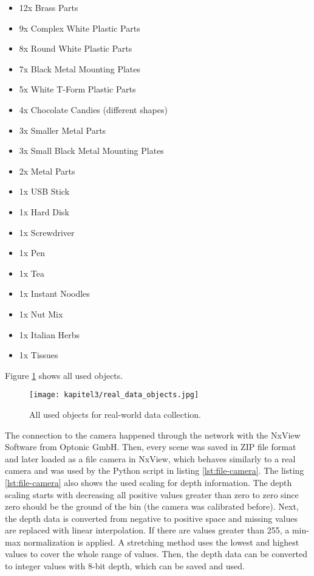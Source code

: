 		\begin{itemize}
			\item 12x Brass Parts
			\item 9x Complex White Plastic Parts
			\item 8x Round White Plastic Parts
			\item 7x Black Metal Mounting Plates
			\item 5x White T-Form Plastic Parts
			\item 4x Chocolate Candies (different shapes)
			\item 3x Smaller Metal Parts
			\item 3x Small Black Metal Mounting Plates
			\item 2x Metal Parts
			\item 1x USB Stick
			\item 1x Hard Disk
			\item 1x Screwdriver
			\item 1x Pen
			\item 1x Tea
			\item 1x Instant Noodles
			\item 1x Nut Mix
			\item 1x Italian Herbs
			\item 1x Tissues
		\end{itemize}
		Figure \ref{img:real-data-objects} shows all used objects.
		\begin{figure}[h]
			\centering
			\texttt{[image: kapitel3/real\_data\_objects.jpg]}
			\caption[All used objects for real-world data collection.]{All used objects for real-world data collection.}
			\label{img:real-data-objects}
		\end{figure}
		
		The connection to the camera happened through the network with the NxView Software from Optonic GmbH. Then, every scene was saved in ZIP file format and later loaded as a file camera in NxView, which behaves similarly to a real camera and was used by the Python script in listing \ref{lst:file-camera}. The listing \ref{lst:file-camera} also shows the used scaling for depth information. The depth scaling starts with decreasing all positive values greater than zero to zero since zero should be the ground of the bin (the camera was calibrated before). Next, the depth data is converted from negative to positive space and missing values are replaced with linear interpolation. If there are values greater than 255, a min-max normalization is applied. A stretching method uses the lowest and highest values to cover the whole range of values. Then, the depth data can be converted to integer values with 8-bit depth, which can be saved and used.
		
